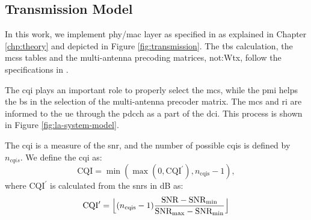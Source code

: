 \subsection{Transmission Model}

%
In this work, we implement \gls{phy}/\gls{mac} layer as specified in \cite{3gpp.38.212} as explained in Chapter \ref{chp:theory} and depicted in Figure \ref{fig:transmission}.
%
%
The \gls{tbs} calculation, the \glspl{mcs} tables and the multi-antenna precoding matrices, \gls{not:Wtx}, follow the specifications in \cite{3gpp.38.214}.
%


The \gls{cqi} plays an important role to properly select the \gls{mcs}, while the \gls{pmi} helps the \gls{bs} in the selection of the multi-antenna precoder matrix.
%
The \gls{mcs} and \gls{ri} are informed to the \gls{ue} through the \gls{pdcch} as a part of the \gls{dci}.
%
This process is shown in Figure \ref{fig:la-system-model}.


The \gls{cqi} is a measure of the \gls{snr}, and the number of possible \gls{cqi}s is defined by $n_{cqis}$. We define the \gls{cqi} as:
\begin{equation}\label{eq:cqi}
\textrm{CQI} = \min{
	(\max {(0, \textrm{CQI}^{\prime} ) }, n_{\text{cqis}} - 1)},
\end{equation}
%
\noindent where $\textrm{CQI}^{\prime}$ is calculated from the \gls{snr}s in dB as:
\begin{equation}\label{eq:cqi_prime}
\textrm{CQI}^{\prime} = \floor[\Big]{(n_{\text{cqis}}-1)\frac{\textrm{SNR} - \textrm{SNR}_{\text{min}}}{\textrm{SNR}_{\text{max}}-\textrm{SNR}_{\text{min}}}}
\end{equation}


